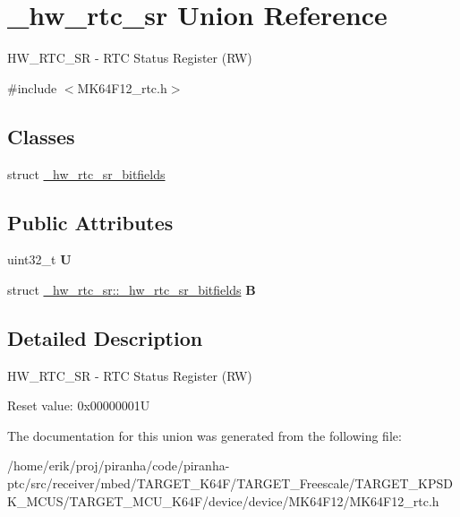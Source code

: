 \hypertarget{union__hw__rtc__sr}{}\section{\+\_\+hw\+\_\+rtc\+\_\+sr Union Reference}
\label{union__hw__rtc__sr}


H\+W\+\_\+\+R\+T\+C\+\_\+\+SR -\/ R\+TC Status Register (RW)  




{\ttfamily \#include $<$M\+K64\+F12\+\_\+rtc.\+h$>$}

\subsection*{Classes}
\begin{DoxyCompactItemize}
\item 
struct \hyperlink{struct__hw__rtc__sr_1_1__hw__rtc__sr__bitfields}{\+\_\+hw\+\_\+rtc\+\_\+sr\+\_\+bitfields}
\end{DoxyCompactItemize}
\subsection*{Public Attributes}
\begin{DoxyCompactItemize}
\item 
uint32\+\_\+t {\bfseries U}\hypertarget{union__hw__rtc__sr_a1d855a331984b187ca3fa0e8110245f9}{}\label{union__hw__rtc__sr_a1d855a331984b187ca3fa0e8110245f9}

\item 
struct \hyperlink{struct__hw__rtc__sr_1_1__hw__rtc__sr__bitfields}{\+\_\+hw\+\_\+rtc\+\_\+sr\+::\+\_\+hw\+\_\+rtc\+\_\+sr\+\_\+bitfields} {\bfseries B}\hypertarget{union__hw__rtc__sr_aa4f23a12c0f43f6dee25f5c2797acd64}{}\label{union__hw__rtc__sr_aa4f23a12c0f43f6dee25f5c2797acd64}

\end{DoxyCompactItemize}


\subsection{Detailed Description}
H\+W\+\_\+\+R\+T\+C\+\_\+\+SR -\/ R\+TC Status Register (RW) 

Reset value\+: 0x00000001U 

The documentation for this union was generated from the following file\+:\begin{DoxyCompactItemize}
\item 
/home/erik/proj/piranha/code/piranha-\/ptc/src/receiver/mbed/\+T\+A\+R\+G\+E\+T\+\_\+\+K64\+F/\+T\+A\+R\+G\+E\+T\+\_\+\+Freescale/\+T\+A\+R\+G\+E\+T\+\_\+\+K\+P\+S\+D\+K\+\_\+\+M\+C\+U\+S/\+T\+A\+R\+G\+E\+T\+\_\+\+M\+C\+U\+\_\+\+K64\+F/device/device/\+M\+K64\+F12/M\+K64\+F12\+\_\+rtc.\+h\end{DoxyCompactItemize}
